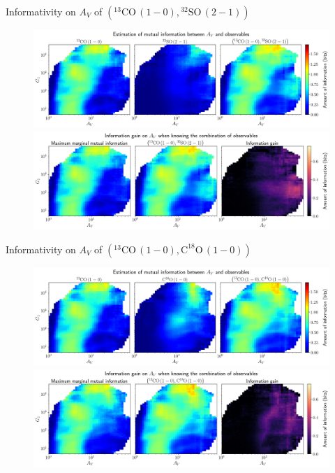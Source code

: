 \documentclass{beamer}
\begin{document}
\begin{frame}{Informativity on $A_V$ of $\left(\mathrm{^{13}CO\,(1-0)},\mathrm{^{32}SO\,(2-1)}\right)$}
    \begin{figure}
        \centering
        \includegraphics[width=0.95\linewidth]{../mi/av__13co10_32so21_mi.png}
        \vfill
        \includegraphics[width=0.95\linewidth]{../mi/av__13co10_32so21_mi_gain.png}
    \end{figure}
\end{frame}

\begin{frame}{Informativity on $A_V$ of $\left(\mathrm{^{13}CO\,(1-0)},\mathrm{C^{18}O\,(1-0)}\right)$}
    \begin{figure}
        \centering
        \includegraphics[width=0.95\linewidth]{../mi/av__13co10_c18o10_mi.png}
        \vfill
        \includegraphics[width=0.95\linewidth]{../mi/av__13co10_c18o10_mi_gain.png}
    \end{figure}
\end{frame}
\end{document}

